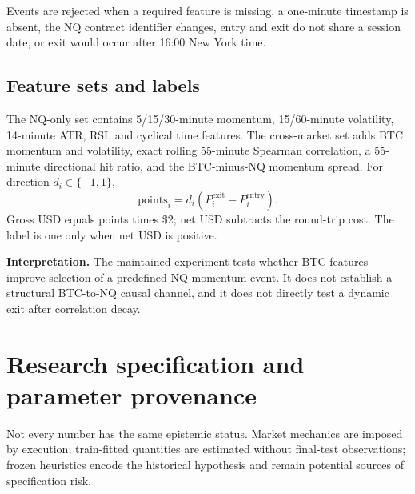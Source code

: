 \documentclass[10pt]{article}
\begin{document}
Events are rejected when a required feature is missing, a one-minute timestamp is absent, the NQ contract identifier changes, entry and exit do not share a session date, or exit would occur after 16:00 New York time.

\subsection*{Feature sets and labels}
The NQ-only set contains 5/15/30-minute momentum, 15/60-minute volatility, 14-minute ATR, RSI, and cyclical time features. The cross-market set adds BTC momentum and volatility, exact rolling 55-minute Spearman correlation, a 55-minute directional hit ratio, and the BTC-minus-NQ momentum spread. For direction $d_i \in \{-1,1\}$,
\[
  \mathrm{points}_i=d_i(P^{\mathrm{exit}}_i-P^{\mathrm{entry}}_i).
\]
Gross USD equals points times \$2; net USD subtracts the round-trip cost. The label is one only when net USD is positive.

\begin{assumptionbox}
\textbf{Interpretation.} The maintained experiment tests whether BTC features improve selection of a predefined NQ momentum event. It does not establish a structural BTC-to-NQ causal channel, and it does not directly test a dynamic exit after correlation decay.
\end{assumptionbox}

\newpage
\thispagestyle{fancy}
\section{Research specification and parameter provenance}
Not every number has the same epistemic status. Market mechanics are imposed by execution; train-fitted quantities are estimated without final-test observations; frozen heuristics encode the historical hypothesis and remain potential sources of specification risk.
\end{document}
